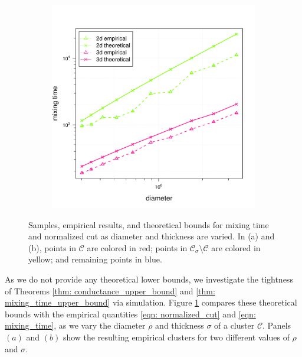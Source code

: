 \documentclass{article}
\newcommand{\1}{\mathbf{1}}
\newcommand{\Cset}{\mathcal{C}}
\newcommand{\Csig}{\Cset_{\sigma}}
\theoremstyle{aldenthm}
\theoremstyle{aldenrmrk}
\begin{document}
\begin{figure}
\begin{adjustbox}{minipage=\linewidth}
\begin{subfigure}{.33\linewidth}
			\caption{}
		\end{subfigure}
		\begin{subfigure}{.33\linewidth}
			\includegraphics[width=\linewidth]{example1plots/diameter_mixing_time_plot}
			\caption{}
		\end{subfigure}
		\caption{Samples, empirical results, and theoretical bounds for mixing time and normalized cut as diameter and thickness are varied. In (a) and (b), points in $\Cset$ are colored in red; points in $\Csig \setminus \Cset$ are colored in yellow; and remaining points in blue.}
		\label{fig:fig1}
	\end{adjustbox}
\end{figure}

As we do not provide any theoretical lower bounds, we investigate the tightness of Theorems \ref{thm: conductance_upper_bound} and \ref{thm: mixing_time_upper_bound} via simulation. Figure \ref{fig:fig1} compares these theoretical bounds with the empirical quantities \eqref{eqn: normalized_cut} and \eqref{eqn: mixing_time}, as we vary the diameter $\rho$ and thickness $\sigma$ of a cluster $\Cset$. Panels $(a)$ and $(b)$ show the resulting empirical clusters for two different values of $\rho$ and $\sigma$.
\end{document}

